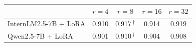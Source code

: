 \begin{tabular}{lcccc}
\toprule
 & $r{=}4$ & $r{=}8$ & $r{=}16$ & $r{=}32$ \\
\midrule
InternLM2.5-7B + LoRA & 0.910 & 0.917\,$^{\dagger}$ & 0.914 & 0.919 \\
Qwen2.5-7B + LoRA & 0.901 & 0.910\,$^{\dagger}$ & 0.904 & 0.908 \\
\bottomrule
\end{tabular}
